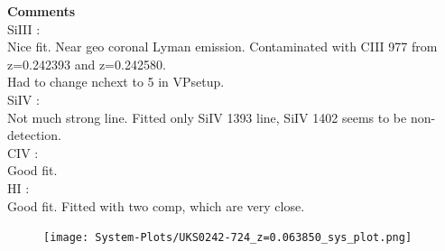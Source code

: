 \documentclass[12pt,draft]{report}
\begin{document}
\textbf{Comments}  \\


SiIII :  \\  \hspace*{1.5cm}
        Nice fit. Near geo coronal Lyman emission. Contaminated with CIII 977 from z=0.242393 and z=0.242580.  \\
        Had to change nchext to 5 in VPsetup.  \\

SiIV :  \\  \hspace*{1.5cm}
        Not much strong line. Fitted only SiIV 1393 line, SiIV 1402 seems to be non-detection.  \\

CIV :  \\  \hspace*{1.5cm}
        Good fit. \\

HI :  \\  \hspace*{1.5cm}
        Good fit. Fitted with two comp, which are very close. \\


\newpage

\begin{landscape}

\begin{figure}
    \centering
    \vspace{-20mm}
    \hspace*{-35mm}
    \texttt{[image: System-Plots/UKS0242-724\_z=0.063850\_sys\_plot.png]}
\end{figure}

\end{landscape}
\end{document}
